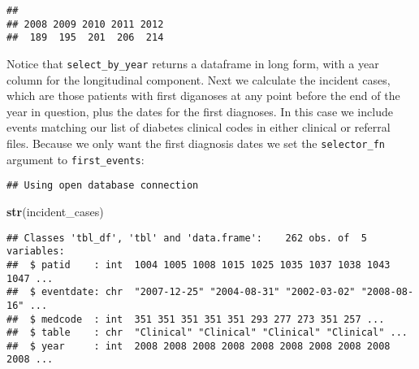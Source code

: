 \documentclass[]{article}
\newenvironment{Shaded}{\begin{snugshade}}{\end{snugshade}}
\newcommand{\KeywordTok}[1]{\textcolor[rgb]{0.13,0.29,0.53}{\textbf{{#1}}}}
\newcommand{\DataTypeTok}[1]{\textcolor[rgb]{0.13,0.29,0.53}{{#1}}}
\newcommand{\DecValTok}[1]{\textcolor[rgb]{0.00,0.00,0.81}{{#1}}}
\newcommand{\StringTok}[1]{\textcolor[rgb]{0.31,0.60,0.02}{{#1}}}
\newcommand{\NormalTok}[1]{{#1}}
\begin{document}
\begin{verbatim}
## 
## 2008 2009 2010 2011 2012 
##  189  195  201  206  214
\end{verbatim}

Notice that \texttt{select\_by\_year} returns a dataframe in long form,
with a year column for the longitudinal component. Next we calculate the
incident cases, which are those patients with first diganoses at any
point before the end of the year in question, plus the dates for the
first diagnoses. In this case we include events matching our list of
diabetes clinical codes in either clinical or referral files. Because we
only want the first diagnosis dates we set the \texttt{selector\_fn}
argument to \texttt{first\_events}:

\begin{Shaded}
\end{Shaded}

\begin{verbatim}
## Using open database connection
\end{verbatim}

\begin{Shaded}
\begin{Highlighting}[]
\KeywordTok{str}\NormalTok{(incident_cases)}
\end{Highlighting}
\end{Shaded}

\begin{verbatim}
## Classes 'tbl_df', 'tbl' and 'data.frame':    262 obs. of  5 variables:
##  $ patid    : int  1004 1005 1008 1015 1025 1035 1037 1038 1043 1047 ...
##  $ eventdate: chr  "2007-12-25" "2004-08-31" "2002-03-02" "2008-08-16" ...
##  $ medcode  : int  351 351 351 351 351 293 277 273 351 257 ...
##  $ table    : chr  "Clinical" "Clinical" "Clinical" "Clinical" ...
##  $ year     : int  2008 2008 2008 2008 2008 2008 2008 2008 2008 2008 ...
\end{verbatim}
\end{document}
